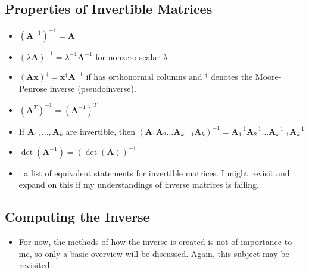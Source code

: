 \begin{itemize}
  \subsection{Properties of Invertible Matrices}\label{Properties of Invertible Matrices}
  \begin{itemize}
    \item \((\bm{A}^{-1} )^{-1} = \bm{A}\)
    \item \((\lambda \bm{A} )^{-1} = \lambda ^{-1} \bm{A} ^{-1} \) for nonzero scalar \(\lambda \)
    \item \((\bm{Ax})^{\dagger} = \bm{x}^{\dagger} \bm{A}^{-1}\) if  has orthonormal columns and \(^\dagger \) denotes the Moore-Penrose inverse (pseudoinverse).
    \item \((\bm{A}^T)^{-1} = (\bm{A}^{-1})^T \)
    \item If \(\bm{A}_1,\ldots,\bm{A}_k \) are invertible, then \((\bm{A}_1\bm{A}_2\ldots \bm{A}_{k-1}\bm{A}_k)^{-1} = \bm{A}_1 ^{-1}\bm{A}_2 ^{-1}\ldots \bm{A}_{k-1}^{-1}\bm{A}_k ^{-1}\) 
    \item \(\det{(\bm{A} ^{-1})} = (\det{(\bm{A})}) ^{-1}\)
    \item {}: a list of equivalent statements for invertible matrices. I might revisit and expand on this if my understandings of inverse matrices is failing. 
  \end{itemize}

  \subsection{Computing the Inverse}\label{Computing the Inverse}
  \begin{itemize}
    \item For now, the methods of how the inverse is created is not of importance to me, so only a basic overview will be discussed. Again, this subject may be revisited.
  \end{itemize}
  
\end{itemize}